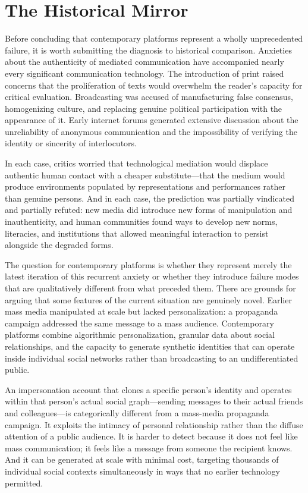 \documentclass[12pt, a4paper]{article}
\begin{document}
\section{The Historical Mirror}

Before concluding that contemporary platforms represent a wholly unprecedented failure, it is worth submitting the diagnosis to historical comparison. Anxieties about the authenticity of mediated communication have accompanied nearly every significant communication technology. The introduction of print raised concerns that the proliferation of texts would overwhelm the reader's capacity for critical evaluation. Broadcasting was accused of manufacturing false consensus, homogenizing culture, and replacing genuine political participation with the appearance of it. Early internet forums generated extensive discussion about the unreliability of anonymous communication and the impossibility of verifying the identity or sincerity of interlocutors.

In each case, critics worried that technological mediation would displace authentic human contact with a cheaper substitute---that the medium would produce environments populated by representations and performances rather than genuine persons. And in each case, the prediction was partially vindicated and partially refuted: new media did introduce new forms of manipulation and inauthenticity, and human communities found ways to develop new norms, literacies, and institutions that allowed meaningful interaction to persist alongside the degraded forms.

The question for contemporary platforms is whether they represent merely the latest iteration of this recurrent anxiety or whether they introduce failure modes that are qualitatively different from what preceded them. There are grounds for arguing that some features of the current situation are genuinely novel. Earlier mass media manipulated at scale but lacked personalization: a propaganda campaign addressed the same message to a mass audience. Contemporary platforms combine algorithmic personalization, granular data about social relationships, and the capacity to generate synthetic identities that can operate inside individual social networks rather than broadcasting to an undifferentiated public.

An impersonation account that clones a specific person's identity and operates within that person's actual social graph---sending messages to their actual friends and colleagues---is categorically different from a mass-media propaganda campaign. It exploits the intimacy of personal relationship rather than the diffuse attention of a public audience. It is harder to detect because it does not feel like mass communication; it feels like a message from someone the recipient knows. And it can be generated at scale with minimal cost, targeting thousands of individual social contexts simultaneously in ways that no earlier technology permitted.
\end{document}
